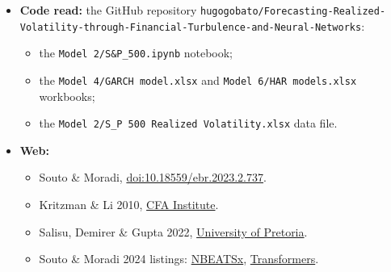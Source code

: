 \documentclass{article}
\begin{document}
\begin{itemize}
\begin{itemize}
\item \texttt{Realised-\allowbreak{}Volatility-\allowbreak{}Forecasting-\allowbreak{}Machine-\allowbreak{}Learning-\allowbreak{}via-\allowbreak{}Financial-\allowbreak{}Word-\allowbreak{}Embedding.\allowbreak{}pdf}.

\end{itemize}

\item \textbf{Code read:} the GitHub repository \texttt{hugogobato/\allowbreak{}Forecasting-\allowbreak{}Realized-\allowbreak{}Volatility-\allowbreak{}through-\allowbreak{}Financial-\allowbreak{}Turbulence-\allowbreak{}and-\allowbreak{}Neural-\allowbreak{}Networks}:

\begin{itemize}

\item the \texttt{Model 2/\allowbreak{}S\&P\_\allowbreak{}500.\allowbreak{}ipynb} notebook;

\item the \texttt{Model 4/\allowbreak{}GARCH model.\allowbreak{}xlsx} and \texttt{Model 6/\allowbreak{}HAR models.\allowbreak{}xlsx} workbooks;

\item the \texttt{Model 2/\allowbreak{}S\_\allowbreak{}P 500 Realized Volatility.\allowbreak{}xlsx} data file.

\end{itemize}

\item \textbf{Web:}

\begin{itemize}

\item Souto \& Moradi, \href{https://doi.org/10.18559/ebr.2023.2.737}{doi:10.18559/\allowbreak{}ebr.2023.2.737}.

\item Kritzman \& Li 2010, \href{https://rpc.cfainstitute.org/research/financial-analysts-journal/2010/skulls-financial-turbulence-and-risk-management}{CFA Institute}.

\item Salisu, Demirer \& Gupta 2022, \href{https://repository.up.ac.za/items/47051c9e-ded9-4528-a489-245319682eb2}{University of Pretoria}.

\item Souto \& Moradi 2024 listings: \href{https://publinova.nl/product/introducing-nbeatsx-to-realized-volatility-forecasting}{NBEATSx}, \href{https://ouci.dntb.gov.ua/works/40RgkoW9}{Transformers}.


\end{itemize}
\end{itemize}
\end{document}
